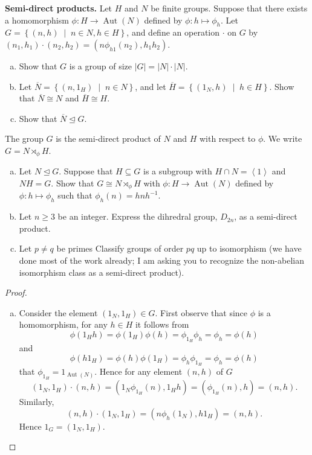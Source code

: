 \documentclass[10pt]{amsart}
\newcommand{\Aut}[1]{\operatorname{Aut}\left(#1\right)}
\newcommand{\abs}[1]{\left| #1 \right|}
\begin{document}
\begin{thm}
  {\bf Semi-direct products.}
  Let $H$ and $N$ be finite groups.
  Suppose that there exists a homomorphism $\phi \colon H \rightarrow \Aut{N}$ defined by $\phi \colon h \mapsto \phi_h$.
  Let $G = \left\{ (n,h) \;\middle\vert\; n \in N, h \in H \right\}$, and define an operation $\cdot$ on $G$ by $(n_1,h_1)\cdot(n_2,h_2) = (n\phi_{h1}(n_2), h_1h_2)$.
  \begin{enumerate}[(a)]
  \item
    Show that $G$ is a group of size $\abs{G} = \abs{N}\cdot\abs{N}$.
  \item
    Let $\overline{N} = \left\{(n, 1_H) \;\middle\vert\; n \in N \right\}$, and let $\overline{H} = \left\{(1_N, h) \;\middle\vert\; h \in H \right\}$.
    Show that $\overline{N} \cong N$ and $\overline{H} \cong H$.
  \item
    Show that $\overline{N} \unlhd G$.
    \setcounter{saveenum}{\value{enumi}}
  \end{enumerate}
  The group $G$ is the semi-direct product of $N$ and $H$ with respect to $\phi$.
  We write $G = N \rtimes_\phi H$.
  \begin{enumerate}[(a)]
    \setcounter{enumi}{\value{saveenum}}
  \item
    Let $N \unlhd G$.
    Suppose that $H \subseteq G$ is a subgroup with $H \cap N = \left< 1 \right>$ and $NH = G$.
    Show that $G \cong N \rtimes_\phi H$ with $\phi \colon H \rightarrow \Aut{N}$ defined by $\phi \colon h \mapsto \phi_h$ such that $\phi_h(n) = hnh^{-1}$.
  \item
    Let $n \geq 3$ be an integer.
    Express the dihredral group, $D_{2n}$, as a semi-direct product.
  \item
    Let $p \not = q$ be primes
    Classify groups of order $pq$ up to isomorphism (we have done most of the work already; I am asking you to recognize the non-abelian isomorphism class as a semi-direct product).
  \end{enumerate}
  \begin{proof}
    \begin{enumerate}[(a)]
    \item
      Consider the element $(1_N, 1_H) \in G$.
      First observe that since $\phi$ is a homomorphism, for any $h \in H$ it follows from 
      $$\phi(1_Hh) = \phi(1_H)\phi(h) = \phi_{1_H}\phi_h = \phi_h = \phi(h)$$
      and
      $$\phi(h1_H) = \phi(h)\phi(1_H) = \phi_h\phi_{1_H} = \phi_h = \phi(h)$$
      that $\phi_{1_H} = 1_{\Aut{N}}$.
      Hence for any element $(n,h)$ of $G$
      $$(1_N,1_H) \cdot (n,h) = (1_N \phi_{1_H}(n), 1_Hh) = (\phi_{1_H}(n), h) = (n, h).$$
      Similarly, 
      $$(n,h) \cdot (1_N,1_H) = (n \phi_{h}(1_N), h1_H) = (n, h).$$
      Hence $1_G = (1_N, 1_H)$.
      

\end{enumerate}
\end{proof}
\end{thm}
\end{document}
